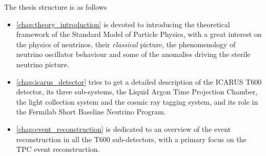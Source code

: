 The thesis structure is as follows\begin{itemize}
    \item \autoref{chap:theory_introduction} is devoted to introducing the theoretical framework of the Standard Model of Particle Physics, with a great interest on the physics of neutrinos, their \emph{classical} picture, the phenomenology of neutrino oscillator behaviour and some of the anomalies driving the sterile neutrino picture. 
    \item \autoref{chap:icarus_detector} tries to get a detailed description of the ICARUS T600 detector, its three sub-systems, the Liquid Argon Time Projection Chamber, the light collection system and the cosmic ray tagging system, and its role in the Fermilab Short Baseline Neutrino Program. 
    \item \autoref{chap:event_reconstruction} is dedicated to an overview of the event reconstruction in all the T600 sub-detectors, with a primary focus on the TPC event reconstruction. 
\end{itemize}

